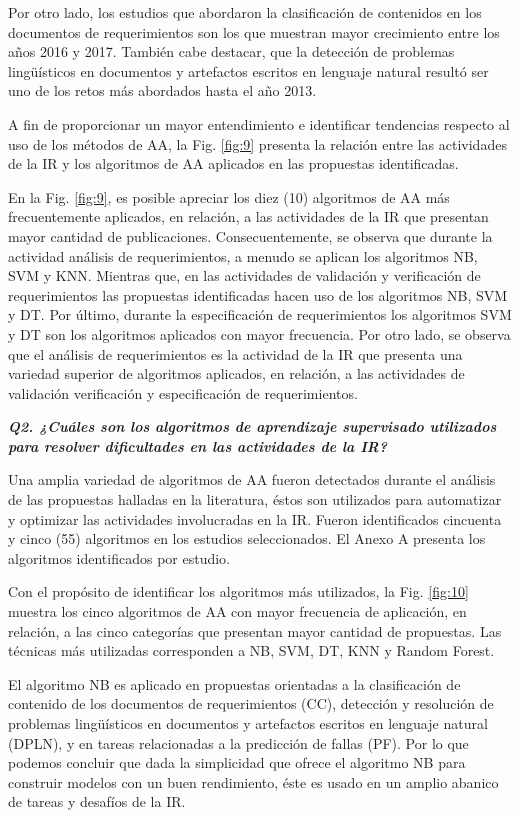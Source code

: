 \documentclass[journal]{IEEEtran}
\begin{document}
Por otro lado, los estudios que abordaron la clasificación de contenidos en los documentos de requerimientos son los que muestran mayor crecimiento entre los años 2016 y 2017. También cabe destacar, que la detección de problemas lingüísticos en documentos y artefactos escritos en lenguaje natural resultó ser uno de los retos más abordados hasta el año 2013.

A fin de proporcionar un mayor entendimiento e identificar tendencias respecto al uso de los métodos de AA, la Fig. \ref{fig:9} presenta la relación entre las actividades de la IR y los algoritmos de AA aplicados en las propuestas identificadas.

En la Fig. \ref{fig:9}, es posible apreciar los diez (10) algoritmos de AA más frecuentemente aplicados, en relación, a las actividades de la IR que presentan mayor cantidad de publicaciones. Consecuentemente, se observa que durante la actividad análisis de requerimientos, a menudo se aplican los algoritmos NB, SVM y KNN. Mientras que, en las actividades de validación y verificación de requerimientos las propuestas identificadas hacen uso de los algoritmos NB, SVM y DT. Por último, durante la especificación de requerimientos los algoritmos SVM y DT son los algoritmos aplicados con mayor frecuencia.  
Por otro lado, se observa que el  análisis de requerimientos es la actividad de la IR que presenta una variedad superior de algoritmos aplicados, en relación, a las actividades de validación verificación y especificación de requerimientos.  


\emph{\textbf{Q2. ¿Cuáles son los algoritmos de aprendizaje supervisado utilizados para resolver dificultades en las actividades de la IR?}}

Una amplia variedad de algoritmos de AA fueron detectados durante el análisis de las propuestas halladas en la literatura, éstos son utilizados para automatizar y optimizar las actividades involucradas en la IR. Fueron identificados cincuenta y cinco (55) algoritmos en los estudios seleccionados. El Anexo A presenta los algoritmos identificados por estudio.

Con el propósito de identificar los algoritmos más utilizados, la Fig. \ref{fig:10} muestra los cinco algoritmos de AA con mayor frecuencia de aplicación, en relación, a las cinco categorías que presentan mayor cantidad de propuestas. Las técnicas más utilizadas corresponden a NB, SVM, DT, KNN y Random Forest.

El algoritmo NB es aplicado en propuestas orientadas a la clasificación de contenido de los documentos de requerimientos (CC), detección y resolución de problemas lingüísticos en documentos y artefactos escritos en lenguaje natural (DPLN), y en tareas relacionadas a la predicción de fallas (PF). 
Por lo que podemos concluir que dada la simplicidad que ofrece el algoritmo NB para construir modelos con un buen rendimiento, éste es usado en un amplio abanico de tareas y desafíos de la IR. 
\end{document}
